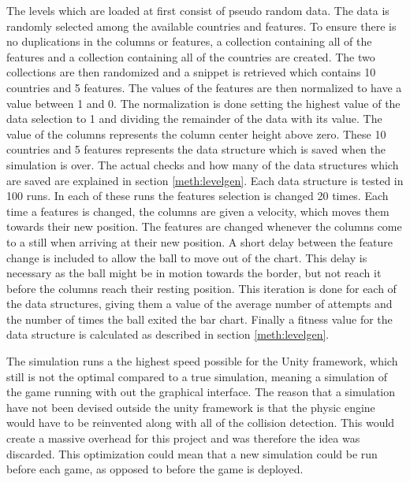 \documentclass[a4paper,11pt]{article}
\begin{document}
The levels which are loaded at first consist of pseudo random data. The data is randomly selected among the available countries and features. To ensure there is no duplications in the columns or features, a collection containing all of the features and a collection containing all of the countries are created. The two collections are then randomized and a snippet is retrieved which contains 10 countries and 5 features. The values of the features are then normalized to have a value between 1 and 0. The normalization is done setting the highest value of the data selection to 1 and dividing the remainder of the data with its value. The value of the columns represents the column center height above zero. These 10 countries and 5 features represents the data structure which is saved when the simulation is over. The actual checks and how many of the data structures which are saved are explained in section \ref{meth:levelgen}. Each data structure is tested in 100 runs. In each of these runs the features selection is changed 20 times. Each time a features is changed, the columns are given a velocity, which moves them towards their new position. The features are changed whenever the columns come to a still when arriving at their new position. A short delay between the feature change is included to allow the ball to move out of the chart. This delay is necessary as the ball might be in motion towards the border, but not reach it before the columns reach their resting position. This iteration is done for each of the data structures, giving them a value of the average number of attempts and the number of times the ball exited the bar chart. Finally a fitness value for the data structure is calculated as described in section \ref{meth:levelgen}.

The simulation runs a the highest speed possible for the Unity framework, which still is not the optimal compared to a true simulation, meaning a simulation of the game running with out the graphical interface. The reason that a simulation have not been devised outside the unity framework is that the physic engine would have to be reinvented along with all of the collision detection. This would create a massive overhead for this project and was therefore the idea was discarded. This optimization could mean that a new simulation could be run before each game, as opposed to before the game is deployed. 
\end{document}

